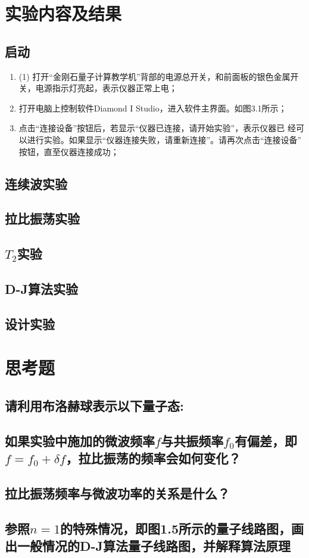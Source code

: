 \documentclass[a4paper]{article}
\begin{document}
\section{实验内容及结果}
\subsection{启动}
\begin{enumerate}
	\item (1) 打开“金刚石量子计算教学机”背部的电源总开关，和前面板的银色金属开
	关，电源指示灯亮起，表示仪器正常上电；
	\item  打开电脑上控制软件Diamond I Studio，进入软件主界面。如图3.1所示；
	\item  点击“连接设备”按钮后，若显示“仪器已连接，请开始实验”，表示仪器已
	经可以进行实验。如果显示“仪器连接失败，请重新连接”。请再次点击“连接设备”
	按钮，直至仪器连接成功；
	
\end{enumerate}

\subsection{连续波实验}
\subsection{拉比振荡实验}
\subsection{$ T_2 $实验}
\subsection{D-J算法实验}
\subsection{设计实验}






\section{思考题}
\subsection*{请利用布洛赫球表示以下量子态:}

\subsection*{如果实验中施加的微波频率$ f $与共振频率$ f_0 $有偏差，即$ f = f_0 + \delta f $，拉比振荡的频率会如何变化？}

\subsection*{拉比振荡频率与微波功率的关系是什么？}

\subsection*{参照$ n=1 $的特殊情况，即图1.5所示的量子线路图，画出一般情况的D-J算法量子线路图，并解释算法原理}



\end{document}
